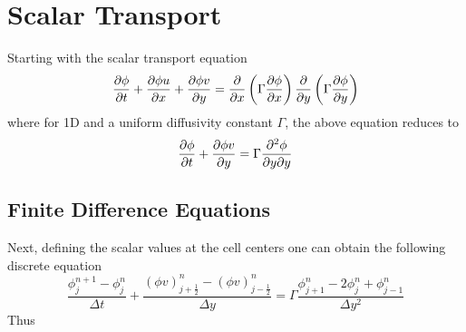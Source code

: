 \section{Scalar Transport}
Starting with the scalar transport equation
\begin{equation}
    \pdv{\phi}{t} + \pdv{\phi u}{x} + \pdv{\phi v}{y} =
        \pdv{}{x}\left(\Gamma \pdv{\phi}{x} \right)
        \pdv{}{y}\left(\Gamma \pdv{\phi}{y} \right)
\end{equation}
where for 1D and a uniform diffusivity constant $\Gamma$, the above
equation reduces to 
\begin{equation}
    \pdv{\phi}{t} + \pdv{\phi v}{y} =
        \Gamma \pdv{\phi}{y}{y}
        \label{eq:scalar-1d}
\end{equation}
\subsection{Finite Difference Equations}
Next, defining the scalar values at the cell centers one can obtain the
following discrete equation 
\begin{equation}
    \frac{\phi^{n+1}_{j} - \phi^{n}_{j}}{\Delta t} + 
    \frac{
        \left(\phi v \right)^{n}_{j+\frac{1}{2}} -
        \left(\phi v \right)^{n}_{j-\frac{1}{2}}
    }{\Delta y}
    =
    \Gamma 
    \frac{
        \phi^{n}_{j+1} - 2\phi^{n}_{j} + \phi^{n}_{j-1}
    }{\Delta y^{2}}
\end{equation}
Thus
